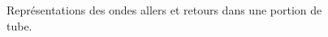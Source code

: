 \begin{figure}[!ht]
    \centering
    
    \caption{Représentations des ondes allers et retours dans une portion de tube.}%
    \label{fig:WavesInDuctPiece}
\end{figure}



%
%

